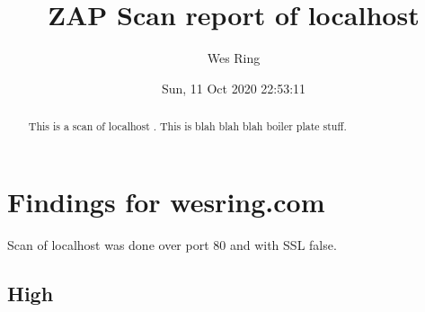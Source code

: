 \documentclass[10pt]{article}
\title{ZAP Scan report of localhost}
\author{Wes Ring}
\date{Sun, 11 Oct 2020 22:53:11}
\begin{document}
\null  %
\nointerlineskip  %
\vfill
\let\snewpage \newpage
\let\newpage \relax
\maketitle
\let \newpage \snewpage
\vfill 
\newpage

{\hypersetup{linktoc=all,hidelinks}
\tableofcontents
}

\newpage
\begin{abstract}
This is a scan of localhost
. This is blah blah blah boiler plate stuff.
\end{abstract}
\section{Findings for wesring.com}
Scan of localhost was done over port 80 and with SSL false.
\subsection{High}
\end{document}
